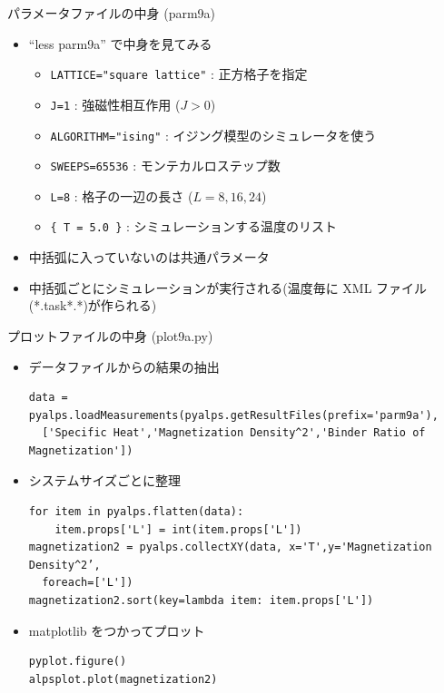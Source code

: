 \begin{frame}[t,fragile]{パラメータファイルの中身 (parm9a)}
  \begin{itemize}
    \setlength{\itemsep}{1em}
  \item ``less parm9a'' で中身を見てみる
    \begin{itemize}
    \item \verb+LATTICE="square lattice"+ : 正方格子を指定
    \item \verb+J=1+ : 強磁性相互作用 ($J>0$)
    \item \verb+ALGORITHM="ising"+ : イジング模型のシミュレータを使う
    \item \verb+SWEEPS=65536+ : モンテカルロステップ数
    \item \verb+L=8+ : 格子の一辺の長さ ($L=8, 16, 24$)
    \item \verb+{ T = 5.0 }+ : シミュレーションする温度のリスト
    \end{itemize}
  \item 中括弧に入っていないのは共通パラメータ
  \item 中括弧ごとにシミュレーションが実行される(温度毎に XML ファイル(*.task*.*)が作られる)
  \end{itemize}
\end{frame}

\begin{frame}{プロットファイルの中身 (plot9a.py)}
  \begin{itemize}
  \item データファイルからの結果の抽出
\begin{lstlisting}
data = pyalps.loadMeasurements(pyalps.getResultFiles(prefix='parm9a'),
  ['Specific Heat','Magnetization Density^2','Binder Ratio of Magnetization'])
\end{lstlisting}
  \item システムサイズごとに整理
\begin{lstlisting}
for item in pyalps.flatten(data):
    item.props['L'] = int(item.props['L'])
magnetization2 = pyalps.collectXY(data, x='T',y='Magnetization Density^2’,
  foreach=['L'])
magnetization2.sort(key=lambda item: item.props['L'])
\end{lstlisting}
  \item matplotlib をつかってプロット
\begin{lstlisting}
pyplot.figure()
alpsplot.plot(magnetization2)
\end{lstlisting}
  \end{itemize}
\end{frame}

